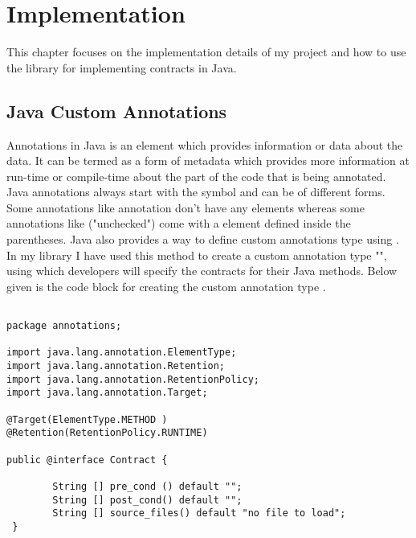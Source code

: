\chapter{Implementation}

This chapter focuses on the implementation details of my project and how to use the library for implementing contracts in Java.

\section{Java Custom Annotations}

Annotations in Java is an element which provides information or data about the data. It can be termed as a form of metadata which provides more information at run-time or compile-time about the part of the code that is being annotated. Java annotations always start with the \@ symbol and can be of different forms. Some annotations like \@override annotation don't have any elements whereas some annotations like \@SuppressWarnings("unchecked") come with a element defined inside the parentheses. 
Java also provides a way to define custom annotations type using \@interface. In my library I have used this method to create a custom annotation type "\@contract", using which developers will specify the contracts for their Java methods.
Below given is the code block for creating the custom annotation type \@contract.

\begin{minipage}{\linewidth}
\lstset{language=Java, caption=Custom Annotationtype, captionpos=b, breaklines=true, showstringspaces=false}       
\begin{lstlisting}[frame=single]

package annotations;

import java.lang.annotation.ElementType;
import java.lang.annotation.Retention;
import java.lang.annotation.RetentionPolicy;
import java.lang.annotation.Target;

@Target(ElementType.METHOD )
@Retention(RetentionPolicy.RUNTIME)

public @interface Contract {
		
		String [] pre_cond () default "";
		String [] post_cond() default "";
		String [] source_files() default "no file to load";
 }

\end{lstlisting}
\end{minipage}

